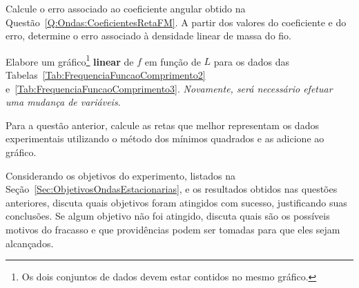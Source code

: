\begin{question}[type={exam}]{1.5}
Calcule o erro associado ao coeficiente angular obtido na Questão~\ref{Q:Ondas:CoeficientesRetaFM}. A partir dos valores do coeficiente e do erro, determine o erro associado à densidade linear de massa do fio.
\end{question}

\begin{question}[type={exam}]{1}
Elabore um gráfico\footnote{Os dois conjuntos de dados devem estar contidos no mesmo gráfico.} \textbf{linear} de $f$ em função de $L$ para os dados das Tabelas~\ref{Tab:FrequenciaFuncaoComprimento2} e~\ref{Tab:FrequenciaFuncaoComprimento3}. \emph{Novamente, será necessário efetuar uma mudança de variáveis}.
\end{question}

\begin{question}[type={exam}]{1}
Para a questão anterior, calcule as retas que melhor representam os dados experimentais utilizando o método dos mínimos quadrados e as adicione ao gráfico.
\end{question}



\begin{question}[type={exam}]{1.5}
Considerando os objetivos do experimento, listados na Seção~\ref{Sec:ObjetivosOndasEstacionarias}, e os resultados obtidos nas questões anteriores, discuta quais objetivos foram atingidos com sucesso, justificando suas conclusões. Se algum objetivo não foi atingido, discuta quais são os possíveis motivos do fracasso e que providências podem ser tomadas para que eles sejam alcançados.
\end{question}


